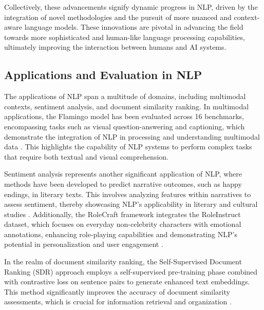 Collectively, these advancements signify dynamic progress in NLP, driven by the integration of novel methodologies and the pursuit of more nuanced and context-aware language models. These innovations are pivotal in advancing the field towards more sophisticated and human-like language processing capabilities, ultimately improving the interaction between humans and AI systems.


\subsection{Applications and Evaluation in NLP} \label{subsec:Applications and Evaluation in NLP}

The applications of NLP span a multitude of domains, including multimodal contexts, sentiment analysis, and document similarity ranking. In multimodal applications, the Flamingo model has been evaluated across 16 benchmarks, encompassing tasks such as visual question-answering and captioning, which demonstrate the integration of NLP in processing and understanding multimodal data \cite{alayrac2022flamingo}. This highlights the capability of NLP systems to perform complex tasks that require both textual and visual comprehension.



Sentiment analysis represents another significant application of NLP, where methods have been developed to predict narrative outcomes, such as happy endings, in literary texts. This involves analyzing features within narratives to assess sentiment, thereby showcasing NLP's applicability in literary and cultural studies \cite{jannidis2016analyzingfeaturesdetectionhappy}. Additionally, the RoleCraft framework integrates the RoleInstruct dataset, which focuses on everyday non-celebrity characters with emotional annotations, enhancing role-playing capabilities and demonstrating NLP's potential in personalization and user engagement \cite{tao2024rolecraftglmadvancingpersonalizedroleplaying}.



In the realm of document similarity ranking, the Self-Supervised Document Ranking (SDR) approach employs a self-supervised pre-training phase combined with contrastive loss on sentence pairs to generate enhanced text embeddings. This method significantly improves the accuracy of document similarity assessments, which is crucial for information retrieval and organization \cite{ginzburg2021selfsuperviseddocumentsimilarityranking}.



